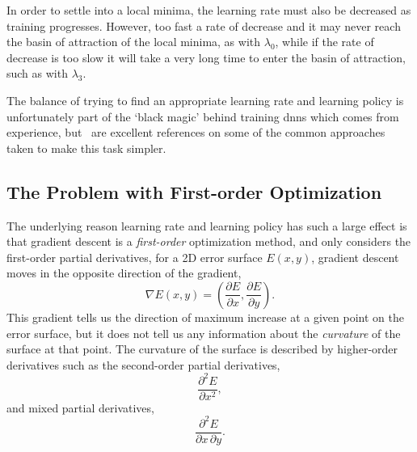 \documentclass[thesis]{subfiles}
\begin{document}
In order to settle into a local minima, the learning rate must also be decreased as training progresses. However, too fast a rate of decrease and it may never reach the basin of attraction of the local minima, as with $\lambda_0$, while if the rate of decrease is too slow it will take a very long time to enter the basin of attraction, such as with $\lambda_3$. 

The balance of trying to find an appropriate learning rate and learning policy is unfortunately part of the `black magic' behind training \glspl{dnn} which comes from experience, but~\citep{Bottou2012sgdtricks, goodfellow2016deep} are excellent references on some of the common approaches taken to make this task simpler.

\subsection{The Problem with First-order Optimization}\label{pathological}
The underlying reason learning rate and learning policy has such a large effect is that gradient descent is a \emph{first-order} optimization method, and only considers the first-order partial derivatives, \ie for a 2D error surface $E(x, y)$, gradient descent moves in the opposite direction of the gradient,
\begin{equation}
    \nabla E(x, y) = {\left(\frac{\partial E}{\partial x}, \frac{\partial E}{\partial y}\right)}.
\end{equation}
This gradient tells us the direction of maximum increase at a given point on the error surface, but it does not tell us any information about the \emph{curvature} of the surface at that point. The curvature of the surface is described by higher-order derivatives such as the second-order partial derivatives, \eg
\begin{equation}
    \frac{\partial^2 E}{\partial x^2},
\end{equation}
and mixed partial derivatives, \eg
\begin{equation}
    \frac{\partial^2 E}{\partial x\,\partial y}.
\end{equation}
%
\end{document}
